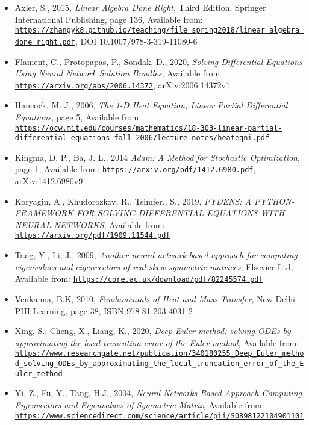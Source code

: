\documentclass[12pt,a4paper]{article}
\begin{document}
\begin{itemize}
	\item Axler, S., 2015, \emph{Linear Algebra Done Right}, Third Edition, Springer International Publishing, page 136, Available from: \href{{https://zhangyk8.github.io/teaching/file_spring2018/linear_algebra_done_right.pdf}}{\nolinkurl{https://zhangyk8.github.io/teaching/file_spring2018/linear_algebra_done_right.pdf}}, DOI 10.1007/978-3-319-11080-6
	\item Flament, C., Protopapas, P., Sondak, D., 2020, \emph{Solving Differential Equations Using Neural Network Solution Bundles}, Available from \href{{https://arxiv.org/abs/2006.14372}}{\nolinkurl{https://arxiv.org/abs/2006.14372}}, arXiv:2006.14372v1
  \item Hancock, M. J., 2006, \emph{The 1-D Heat Equation, Linear Partial Differential Equations}, page 5, Available from \href{{https://ocw.mit.edu/courses/mathematics/18-303-linear-partial-differential-equations-fall-2006/lecture-notes/heateqni.pdf}}{\nolinkurl{https://ocw.mit.edu/courses/mathematics/18-303-linear-partial-differential-equations-fall-2006/lecture-notes/heateqni.pdf}}
  \item Kingma, D. P., Ba, J. L., 2014 \emph{Adam: A Method for Stochastic Optimization}, page 1, Available from: \href{{https://arxiv.org/pdf/1412.6980.pdf}}{\nolinkurl{https://arxiv.org/pdf/1412.6980.pdf}}, arXiv:1412.6980v9
  \item Koryagin, A., Khudorozkov, R., Tsimfer., S., 2019, \emph{PYDENS: A PYTHON-FRAMEWORK FOR SOLVING DIFFERENTIAL EQUATIONS WITH NEURAL NETWORKS}, Available from: \href{{https://arxiv.org/pdf/1909.11544.pdf}}{\nolinkurl{https://arxiv.org/pdf/1909.11544.pdf}}
  \item Tang, Y., Li, J., 2009, \emph{Another neural network based approach for computing eigenvalues and eigenvectors of real skew-symmetric matrices}, Elsevier Ltd, Available from: \href{{https://core.ac.uk/download/pdf/82245574.pdf}}{\nolinkurl{https://core.ac.uk/download/pdf/82245574.pdf}}
  \item Venkanna, B.K, 2010, \emph{Fundamentals of Heat and Mass Transfer}, New Delhi PHI Learning, page 38, ISBN-978-81-203-4031-2
  \item Xing, S., Cheng, X., Liang, K., 2020, \emph{Deep Euler method: solving ODEs by approximating the local truncation error of the Euler method}, Available from: \href{{https://www.researchgate.net/publication/340180255_Deep_Euler_method_solving_ODEs_by_approximating_the_local_truncation_error_of_the_Euler_method}}{\nolinkurl{https://www.researchgate.net/publication/340180255_Deep_Euler_method_solving_ODEs_by_approximating_the_local_truncation_error_of_the_Euler_method}}
  \item Yi, Z., Fu, Y., Tang, H.J., 2004, \emph{Neural Networks Based Approach Computing Eigenvectors and Eigenvalues of Symmetric Matrix}, Available from: \href{{https://www.sciencedirect.com/science/article/pii/S0898122104901101}}{\nolinkurl{https://www.sciencedirect.com/science/article/pii/S0898122104901101}}
\end{itemize}
\end{document}
